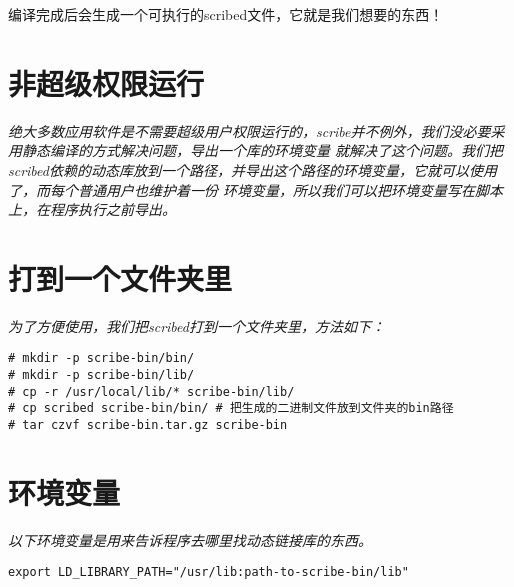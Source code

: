 \documentclass{article}
\begin{document}
编译完成后会生成一个可执行的scribed文件，它就是我们想要的东西！

\section{非超级权限运行}
\textit{
绝大多数应用软件是不需要超级用户权限运行的，scribe并不例外，我们没必要采用静态编译的方式解决问题，导出一个库的环境变量
就解决了这个问题。我们把scribed依赖的动态库放到一个路径，并导出这个路径的环境变量，它就可以使用了，而每个普通用户也维护着一份
环境变量，所以我们可以把环境变量写在脚本上，在程序执行之前导出。
}

\section{打到一个文件夹里}
\textit{
为了方便使用，我们把scribed打到一个文件夹里，方法如下：
}

\begin{verbatim}
# mkdir -p scribe-bin/bin/
# mkdir -p scribe-bin/lib/
# cp -r /usr/local/lib/* scribe-bin/lib/ 
# cp scribed scribe-bin/bin/ # 把生成的二进制文件放到文件夹的bin路径
# tar czvf scribe-bin.tar.gz scribe-bin

\end{verbatim}

\section{环境变量}
\textit{
以下环境变量是用来告诉程序去哪里找动态链接库的东西。
}

\begin{verbatim}
export LD_LIBRARY_PATH="/usr/lib:path-to-scribe-bin/lib"
\end{verbatim}
\end{document}
